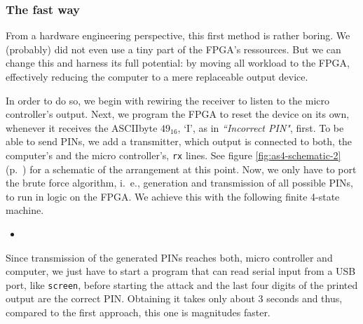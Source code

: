\subsubsection*{The fast way}
From a hardware engineering perspective, this first method is rather boring. We (probably) did not even use a tiny part of the FPGA's ressources. 
But we can change this and harness its full potential: by moving all workload to the FPGA, effectively reducing the computer to a mere replaceable output device. 

In order to do so, we begin with rewiring the receiver to listen to the micro controller's output.
Next, we program the FPGA to reset the device on its own, whenever it receives the ASCIIbyte $49_{16}$, `I', as in \textit{``Incorrect PIN"}, first. 
To be able to send PINs, we add a transmitter, which output is connected to both, the computer's and the micro controller's, \texttt{rx} lines. 
See figure \ref{fig:as4-schematic-2} (p.~\pageref{fig:as4-schematic-2}) for a schematic of the arrangement at this point.
Now, we only have to port the brute force algorithm, i.~e., generation and transmission of all possible PINs, to run in logic on the FPGA. We achieve this with the following finite 4-state machine.

\begin{itemize}
    \item[] 
\end{itemize}

Since transmission of the generated PINs reaches both, micro controller and computer, we just have to start a program that can read serial input from a USB port, like \texttt{screen}, before starting the attack and the last four digits of the printed output are the correct PIN. Obtaining it takes only about 3 seconds and thus, compared to the first approach, this one is magnitudes faster.

